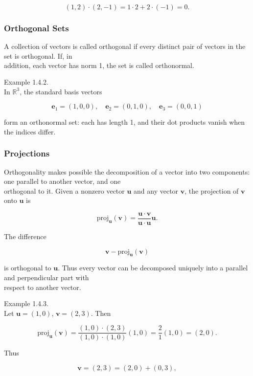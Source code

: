 \documentclass[
  12pt,
  a4paper,
]{article}
\begin{document}
\[(1,2) \cdot (2,-1) = 1\cdot 2 + 2\cdot (-1) = 0.\]

\subsubsection{Orthogonal Sets}\label{orthogonal-sets}

A collection of vectors is called orthogonal if every distinct pair of
vectors in the set is orthogonal. If, in\\
addition, each vector has norm 1, the set is called orthonormal.

Example 1.4.2.\\
In \(\mathbb{R}^3\), the standard basis vectors

\[\mathbf{e}_1 = (1,0,0), \quad \mathbf{e}_2 = (0,1,0), \quad \mathbf{e}_3 = (0,0,1)\]

form an orthonormal set: each has length 1, and their dot products
vanish when the indices differ.

\subsubsection{Projections}\label{projections}

Orthogonality makes possible the decomposition of a vector into two
components: one parallel to another vector, and one\\
orthogonal to it. Given a nonzero vector \(\mathbf{u}\) and any vector
\(\mathbf{v}\), the projection of \(\mathbf{v}\)\\
onto \(\mathbf{u}\) is

\[\text{proj}_{\mathbf{u}}(\mathbf{v}) = \frac{\mathbf{u} \cdot \mathbf{v}}{\mathbf{u} \cdot \mathbf{u}} \mathbf{u}.\]

The difference

\[\mathbf{v} - \text{proj}_{\mathbf{u}}(\mathbf{v})\]

is orthogonal to \(\mathbf{u}\). Thus every vector can be decomposed
uniquely into a parallel and perpendicular part with\\
respect to another vector.

Example 1.4.3.\\
Let \(\mathbf{u} = (1,0)\), \(\mathbf{v} = (2,3)\). Then

\[\text{proj}_{\mathbf{u}}(\mathbf{v}) = \frac{(1,0)\cdot(2,3)}{(1,0)\cdot(1,0)} (1,0)
= \frac{2}{1}(1,0) = (2,0).\]

Thus

\[\mathbf{v} = (2,3) = (2,0) + (0,3),\]
\end{document}
